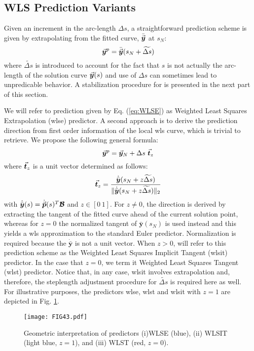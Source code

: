 \subsection{WLS Prediction Variants}\label{CH5-S2SS2}

Given an increment in the arc-length $\Delta s$, a straightforward prediction
scheme is given by extrapolating from the fitted curve, $\bar{\vec{\bm{y}}}$ at 
$s_N$:
\begin{equation}
	\vec{\bm{y}}^p = \bar{\vec{\bm{y}}}(s_N+\widetilde{\Delta s})
	\label{eq:WLSE}
\end{equation}
where $\widetilde{\Delta s}$ is introduced to account for the fact that $s$ is
not actually the arc-length of the solution curve $\vec{\bm{y}}(s)$ and use of 
$\Delta s$ can 
sometimes lead to unpredicable behavior. A stabilization procedure for is 
presented in the next part of this section. 

We will refer to prediction given by Eq. (\ref{eq:WLSE}) as Weighted Least 
Squares 
Extrapolation (\acrshort{wlse}) predictor. A second approach is to derive the 
prediction direction from first order
information of the local \acrshort{wls} curve, which is trivial to retrieve. We 
propose the following general formula:
\begin{equation}
	\vec{\bm{y}}^p = \vec{\bm{y}}_N + \Delta s\ \vec{\bm{t}}_z
	\label{eq:WLSIT}
\end{equation}
where $\vec{\bm{t}}_z$ is a unit vector determined as follows:
\begin{equation}
	\vec{\bm{t}}_z = \dfrac{\dot{\bar{\bm{y}}}(s_N+z\widetilde{\Delta
			s})}{\Vert\dot{\bar{\bm{y}}}(s_N+z\widetilde{\Delta s})\Vert_2}
	\label{eq:ImplicitTangent}
\end{equation}
with $\dot{\bar{\bm{y}}}(s)=\dot{\vec{\bm{p}}}(s)^T\bm{\mathcal{B}}$ and $z\in[0\ 
1]$. For
$z\neq 0$, the direction is derived by extracting the tangent of the fitted
curve ahead of the current solution point, whereas for $z=0$ the normalized 
tangent of $\bar{\bm{y}}(s_N)$ is used instead and this yields a
\acrshort{wls} approximation to the standard Euler predictor. Normalization is 
required
because the $\dot{\bar{\bm{y}}}$ is not a unit vector. When $z>0$, will refer to
this prediction scheme as the Weighted Least Squares Implicit Tangent 
(\acrshort{wlsit}) predictor. In the case that $z=0$, we term it Weighted Least 
Squares Tangent
(\acrshort{wlst}) predictor. Notice that, in any case, \acrshort{wlsit} 
involves extrapolation and,
therefore, the steplength adjustment procedure for $\widetilde{\Delta s}$ is
required here as well. For illustrative purposes, the predictors 
\acrshort{wlse}, \acrshort{wlst}
and \acrshort{wlsit} with $z=1$ are depicted in Fig.
\ref{fig:DifferentialPredictors}.
\begin{figure}[t]
	\centering
	\texttt{[image: FIG43.pdf]}
	\caption{Geometric interpretation of predictors (i)WLSE (blue), (ii) WLSIT
		(light blue, $z=1$), and (iii) WLST (red, $z=0$).}
	\label{fig:DifferentialPredictors}
\end{figure}

